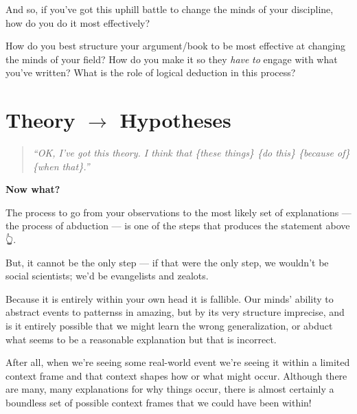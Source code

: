 \documentclass[
  letterpaper,
  DIV=11,
  numbers=noendperiod]{scrreprt}
\begin{document}
And so, if you've got this uphill battle to change the minds of your
discipline, how do you do it most effectively?

\begin{tcolorbox}[enhanced jigsaw, bottomtitle=1mm, coltitle=black, colback=white, colframe=quarto-callout-note-color-frame, title=\textcolor{quarto-callout-note-color}{\faInfo}\hspace{0.5em}{Changing Minds: Part 1}, opacityback=0, arc=.35mm, titlerule=0mm, leftrule=.75mm, toptitle=1mm, rightrule=.15mm, opacitybacktitle=0.6, colbacktitle=quarto-callout-note-color!10!white, toprule=.15mm, left=2mm, bottomrule=.15mm, breakable]

How do you best structure your argument/book to be most effective at
changing the minds of your field? How do you make it so they \emph{have}
\emph{to} engage with what you've written? What is the role of logical
deduction in this process?

\end{tcolorbox}

\section{\texorpdfstring{Theory \(\rightarrow\)
Hypotheses}{Theory \textbackslash rightarrow Hypotheses}}\label{theory-rightarrow-hypotheses}

\begin{quote}
\emph{``OK, I've got this theory. I think that \{these things\} \{do
this\} \{because of\} \{when that\}.''}
\end{quote}

\textbf{Now what?}

The process to go from your observations to the most likely set of
explanations --- the process of abduction --- is one of the steps that
produces the statement above 👆.

But, it cannot be the only step --- if that were the only step, we
wouldn't be social scientists; we'd be evangelists and zealots.

Because it is entirely within your own head it is fallible. Our minds'
ability to abstract events to patternss in amazing, but by its very
structure imprecise, and is it entirely possible that we might learn the
wrong generalization, or abduct what seems to be a reasonable
explanation but that is incorrect.

After all, when we're seeing some real-world event we're seeing it
within a limited context frame and that context shapes how or what might
occur. Although there are many, many explanations for why things occur,
there is almost certainly a boundless set of possible context frames
that we could have been within!
\end{document}
